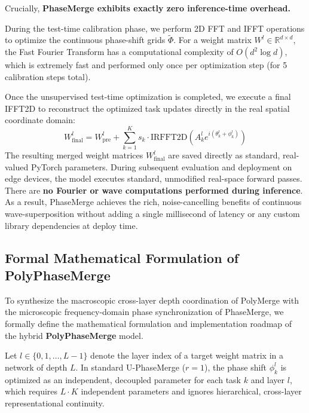 \documentclass{article}
\theoremstyle{plain}
\theoremstyle{definition}
\theoremstyle{remark}
\begin{document}
Crucially, \textbf{PhaseMerge exhibits exactly zero inference-time overhead.}

During the test-time calibration phase, we perform 2D FFT and IFFT operations to optimize the continuous phase-shift grids $\tilde{\Phi}$. For a weight matrix $W^l \in \mathbb{R}^{d \times d}$, the Fast Fourier Transform has a computational complexity of $O(d^2 \log d)$, which is extremely fast and performed only once per optimization step (for 5 calibration steps total). 

Once the unsupervised test-time optimization is completed, we execute a final IFFT2D to reconstruct the optimized task updates directly in the real spatial coordinate domain:
\begin{equation}
    W^l_{\text{final}} = W^l_{\text{pre}} + \sum_{k=1}^K s_k \cdot \text{IRFFT2D}\left( A_k^l e^{i (\theta_k^l + \phi_k^l)} \right)
\end{equation}
The resulting merged weight matrices $W^l_{\text{final}}$ are saved directly as standard, real-valued PyTorch parameters. During subsequent evaluation and deployment on edge devices, the model executes standard, unmodified real-space forward passes. There are \textbf{no Fourier or wave computations performed during inference}. As a result, PhaseMerge achieves the rich, noise-cancelling benefits of continuous wave-superposition without adding a single millisecond of latency or any custom library dependencies at deploy time.

\subsection{Formal Mathematical Formulation of PolyPhaseMerge}
\label{sec:app_polyphasemerge}

To synthesize the macroscopic cross-layer depth coordination of PolyMerge with the microscopic frequency-domain phase synchronization of PhaseMerge, we formally define the mathematical formulation and implementation roadmap of the hybrid \textbf{PolyPhaseMerge} model.

Let $l \in \{0, 1, \dots, L-1\}$ denote the layer index of a target weight matrix in a network of depth $L$. In standard U-PhaseMerge ($r=1$), the phase shift $\phi_k^l$ is optimized as an independent, decoupled parameter for each task $k$ and layer $l$, which requires $L \cdot K$ independent parameters and ignores hierarchical, cross-layer representational continuity. 
\end{document}

